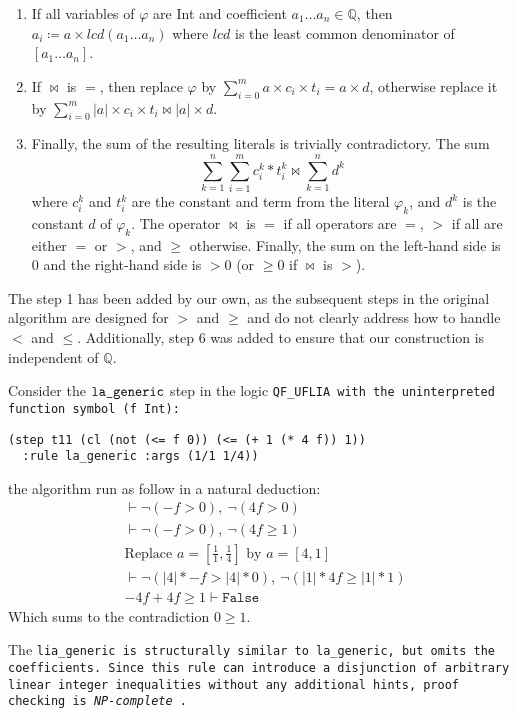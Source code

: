 \begin{enumerate}
    \item If all variables of $\varphi$ are Int and coefficient $a_1 \dots a_n \in \mathbb{Q}$,
    then $a_i \coloneq a \times \mathit{lcd}(a_1 \dots a_n)$ where $\mathit{lcd}$ is the least common denominator of $[a_1 \dots a_n]$.
    
    \item If $\bowtie$ is $=$, then replace $\varphi$ by
    $\sum_{i=0}^{m}a\times{}c_i\times{}t_i = a\times{}d$, otherwise replace it by
    $\sum_{i=0}^{m}|a|\times{}c_i\times{}t_i \bowtie |a|\times{}d$.

    \item Finally, the sum of the resulting literals is trivially contradictory.
    The sum
    \[
        \sum_{k=1}^{n}\sum_{i=1}^{m}c_i^k*t_i^k \bowtie \sum_{k=1}^{n}d^k
    \]
  where $c_i^k$ and $t_i^k$ are the constant and term from the literal $\varphi_k$, and $d^k$ is the constant $d$ of $\varphi_k$.
  The operator $\bowtie$ is $=$ if all operators are $=$, $>$ if all are either $=$ or $>$, and $\geq$ otherwise. Finally, the sum on the left-hand side is $0$ and the right-hand side is $>0$ (or $\geq 0$ if $\bowtie$ is $>$).

\end{enumerate}

The step 1 has been added by our own, as the subsequent steps in the original algorithm are designed for $>$ and $\geq$ and do not clearly address how to handle $<$ and $\leq$.
Additionally, step 6  was added to ensure that our construction is independent of $\mathbb{Q}$.

\begin{example}
Consider the $\tt{la\_generic}$ step in the logic \tt{QF\_UFLIA} with the uninterpreted function symbol \lstinline[language=SMT]|(f Int)|:
\begin{lstlisting}[language=SMT,label={lst:smtexampleinput}]
(step t11 (cl (not (<= f 0)) (<= (+ 1 (* 4 f)) 1))
  :rule la_generic :args (1/1 1/4))
\end{lstlisting} the algorithm run as follow in a natural deduction:
\begin{align}
&\vdash \neg (- f > 0),~ \neg(4f > 0) \label{eq:step2}\tag{Step 2}\\
&\vdash \neg (- f > 0),~ \neg(4f \geq 1) \label{eq:step3}\tag{Step 3}\\
&\text{Replace } a = [\frac{1}{1}, \frac{1}{4}] \text{ by } a = [4, 1] \label{eq:step4}\tag{Step 4}\\
&\vdash \neg (|4| * - f > |4| * 0 ), ~ \neg(|1| * 4f \geq |1| * 1) \label{eq:step5}\tag{Step 5} \\
&-4f + 4f \geq 1 \vdash \mathtt{False} \label{eq:step6}\tag{Step 6}
\end{align}
Which sums to the contradiction  $0 \geq 1$. 
\end{example}

The \tt{lia\_generic} is structurally similar to \tt{la\_generic}, but omits the coefficients.
Since this rule can introduce a disjunction of arbitrary linear integer inequalities without any additional hints, proof checking is \emph{NP-complete} \cite{Schrijver:lia}.
